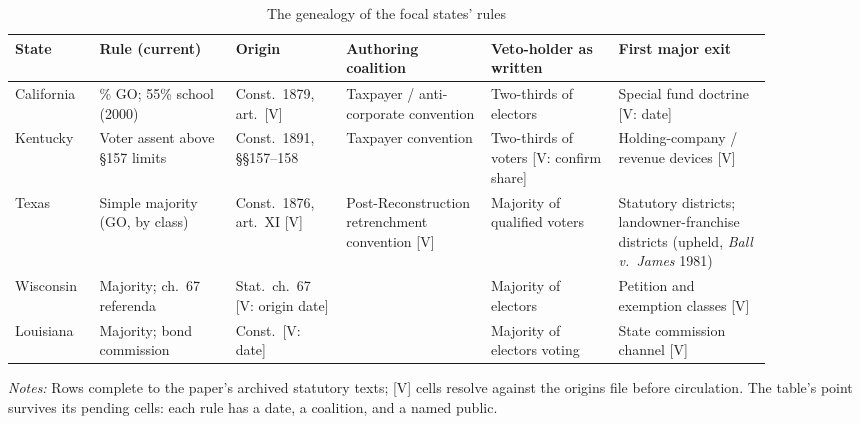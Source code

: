 \begin{table}[!htbp]\centering\footnotesize
\caption{The genealogy of the focal states' rules}\label{tab:genealogy}
\begin{tabular}{@{}>{\raggedright\arraybackslash}p{0.09\linewidth}>{\raggedright\arraybackslash}p{0.16\linewidth}>{\raggedright\arraybackslash}p{0.13\linewidth}>{\raggedright\arraybackslash}p{0.17\linewidth}>{\raggedright\arraybackslash}p{0.15\linewidth}>{\raggedright\arraybackslash}p{0.18\linewidth}@{}}
\toprule
State & Rule (current) & Origin & Authoring coalition & Veto-holder as written & First major exit \\
\midrule
California & 66.7\% GO; 55\% school (2000) & Const.\ 1879, art.\ [V] & Taxpayer / anti-corporate convention & Two-thirds of electors & Special fund doctrine [V: date] \\ \addlinespace
Kentucky & Voter assent above \S 157 limits & Const.\ 1891, \S\S 157--158 & Taxpayer convention & Two-thirds of voters [V: confirm share] & Holding-company / revenue devices [V] \\ \addlinespace
Texas & Simple majority (GO, by class) & Const.\ 1876, art.\ XI [V] & Post-Reconstruction retrenchment convention [V] & Majority of qualified voters & Statutory districts; landowner-franchise districts (upheld, \emph{Ball v.\ James} 1981) \\ \addlinespace
Wisconsin & Majority; ch.\ 67 referenda & Stat.\ ch.\ 67 [V: origin date] & [V] & Majority of electors & Petition and exemption classes [V] \\ \addlinespace
Louisiana & Majority; bond commission & Const.\ [V: date] & [V] & Majority of electors voting & State commission channel [V] \\
\bottomrule
\end{tabular}
\begin{minipage}{0.96\linewidth}\vspace{2pt}\scriptsize
\emph{Notes:} Rows complete to the paper's archived statutory texts; [V] cells resolve against the origins file before circulation. The table's point survives its pending cells: each rule has a date, a coalition, and a named public.
\end{minipage}
\end{table}
